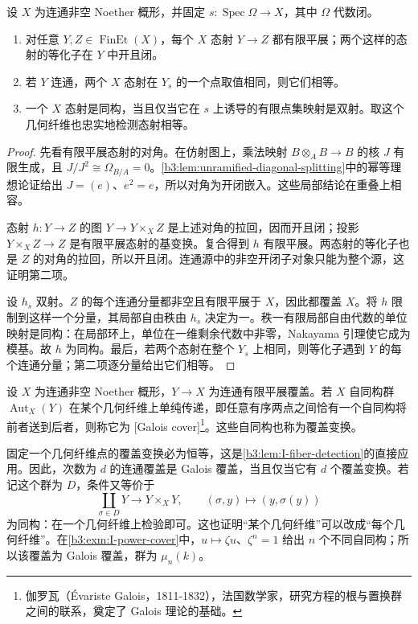 \begin{lemma}\label{b3:lem:I-fiber-detection}
	设 \(X\) 为连通非空 Noether 概形，并固定 \(s:\operatorname{Spec}\Omega\rightarrow X\)，其中 \(\Omega\) 代数闭。
	\begin{enumerate}
		\item 对任意 \(Y,Z\in\operatorname{FinEt}(X)\)，每个 \(X\) 态射 \(Y\rightarrow Z\) 都有限平展；两个这样的态射的等化子在 \(Y\) 中开且闭。
		\item 若 \(Y\) 连通，两个 \(X\) 态射在 \(Y_s\) 的一个点取值相同，则它们相等。
		\item 一个 \(X\) 态射是同构，当且仅当它在 \(s\) 上诱导的有限点集映射是双射。取这个几何纤维也忠实地检测态射相等。
	\end{enumerate}
\end{lemma}
\begin{proof}
	先看有限平展态射的对角。在仿射图上，乘法映射 \(B\otimes_A B\rightarrow B\) 的核 \(J\) 有限生成，且 \(J/J^2\cong\Omega_{B/A}=0\)。\cref{b3:lem:unramified-diagonal-splitting}中的幂等理想论证给出 \(J=(e)\)、\(e^2=e\)，所以对角为开闭嵌入。这些局部结论在重叠上相容。

	态射 \(h:Y\rightarrow Z\) 的图 \(Y\rightarrow Y\times_X Z\) 是上述对角的拉回，因而开且闭；投影 \(Y\times_X Z\rightarrow Z\) 是有限平展态射的基变换。复合得到 \(h\) 有限平展。两态射的等化子也是 \(Z\) 的对角的拉回，所以开且闭。连通源中的非空开闭子对象只能为整个源，这证明第二项。

	设 \(h_s\) 双射。\(Z\) 的每个连通分量都非空且有限平展于 \(X\)，因此都覆盖 \(X\)。将 \(h\) 限制到这样一个分量，其局部自由秩由 \(h_s\) 决定为一。秩一有限局部自由代数的单位映射是同构：在局部环上，单位在一维剩余代数中非零，Nakayama 引理使它成为模基。故 \(h\) 为同构。最后，若两个态射在整个 \(Y_s\) 上相同，则等化子遇到 \(Y\) 的每个连通分量；第二项逐分量给出它们相等。
\end{proof}

\begin{definition}\label{b3:def:I-galois-cover}
	设 \(X\) 为连通非空 Noether 概形，\(Y\rightarrow X\) 为连通有限平展覆盖。若 \(X\) 自同构群 \(\operatorname{Aut}_X(Y)\) 在某个几何纤维上单纯传递，即任意有序两点之间恰有一个自同构将前者送到后者，则称它为 [Galois cover]\footnote{伽罗瓦（Évariste Galois，1811-1832），法国数学家，研究方程的根与置换群之间的联系，奠定了 Galois 理论的基础。}。这些自同构也称为覆盖变换。
\end{definition}

固定一个几何纤维点的覆盖变换必为恒等，这是\cref{b3:lem:I-fiber-detection}的直接应用。因此，次数为 \(d\) 的连通覆盖是 Galois 覆盖，当且仅当它有 \(d\) 个覆盖变换。若记这个群为 \(D\)，条件又等价于
\[
	\coprod_{\sigma\in D}Y\longrightarrow Y\times_XY,
	\qquad (\sigma,y)\longmapsto(y,\sigma(y))
\]
为同构：在一个几何纤维上检验即可。这也证明“某个几何纤维”可以改成“每个几何纤维”。在\cref{b3:exm:I-power-cover}中，\(u\mapsto\zeta u\)、\(\zeta^n=1\) 给出 \(n\) 个不同自同构；所以该覆盖为 Galois 覆盖，群为 \(\mu_n(k)\)。

